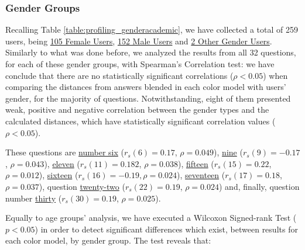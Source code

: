 \subsubsection{Gender Groups}
\label{subsubsec:demo_age}
%
Recalling Table \ref{table:profiling_genderacademic}, we have collected a total of 259 users, being \ul{105 Female Users}, \ul{152 Male Users} and \ul{2 Other Gender Users}. Similarly to what was done before, we analyzed the results from
all 32 questions, for each of these gender groups, with Spearman's Correlation test: we have conclude that there are no statistically significant correlations ($\rho < 0.05$) when comparing the distances from answers blended in each color model with users' gender, for the majority of questions.
Notwithstanding, eight of them presented weak, positive and negative correlation between the gender types and the calculated distances, which have statistically significant correlation values ($\rho < 0.05$). \par
%
These questions are \ul{number six} ($r_s(6) = 0.17$, $\rho = 0.049$), \ul{nine} ($r_s(9) = -0.17$, $\rho = 0.043$), \ul{eleven} ($r_s(11) = 0.182$, $\rho = 0.038$), \ul{fifteen} ($r_s(15) = 0.22$, $\rho = 0.012$), \ul{sixteen} ($r_s(16) = -0.19, \rho = 0.024$), \ul{seventeen}
($r_s(17) = 0.18$, $\rho = 0.037$), question \ul{twenty-two} ($r_s(22) = 0.19$, $\rho = 0.024$) and, finally, question number \ul{thirty} ($r_s(30) = 0.19$, $\rho = 0.025$). \par
%
Equally to age groups' analysis, we have executed a Wilcoxon Signed-rank Test ($p < 0.05$) in order to detect significant differences which exist, between results for each color model, by gender group. The test reveals that:
%
